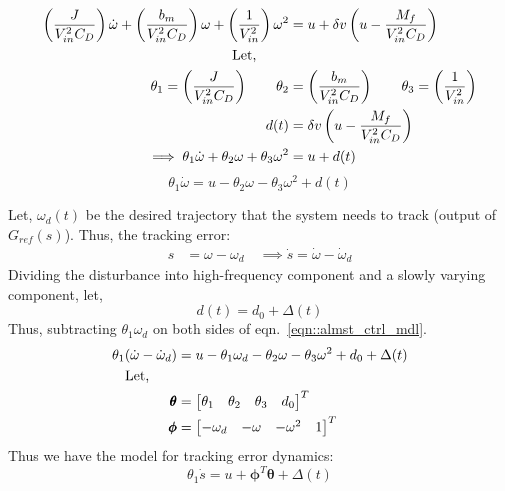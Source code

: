\begin{align*}
    \left( \frac{J}{V_{in}^2 C_D} \right) \dot \omega + \left( \frac{b_m}{V_{in}^2 C_D} \right) \omega + \left( \frac{1}{V_{in}^2} \right) \omega^2  &= u + \delta v \left( u - \frac{M_f}{V_{in}^2 C_D} \right)\\
    \text{Let, } \qquad &\\
    \theta_1 = \left( \frac{J}{V_{in}^2 C_D} \right) \qquad
    \theta_2 &= \left( \frac{b_m}{V_{in}^2 C_D} \right)\qquad
    \theta_3 = \left( \frac{1}{V_{in}^2} \right)\\
    d(t) &= \delta v \left( u - \frac{M_f}{V_{in}^2 C_D} \right)\\
    \implies \theta_1 \dot \omega + \theta_2 \omega + \theta_3 \omega^2 &= u + d(t)
\end{align*}
\begin{equation}\label{eqn::almst_ctrl_mdl}
    \theta_1 \dot \omega = u - \theta_2 \omega - \theta_3 \omega^2 + d(t)
\end{equation}

Let, $\omega_d(t)$ be the desired trajectory that the system needs to track
(output of $G_{ref}(s)$). Thus, the tracking error:
\begin{align*}
    s &= \omega - \omega_d \quad \implies \dot s = \dot \omega - \dot \omega_d
\end{align*}
Dividing the disturbance into high-frequency component and a slowly varying
component, let, $$d(t) = d_0 + \Delta(t)$$
Thus, subtracting $\theta_1 \omega_d$ on both sides of eqn.~\ref{eqn::almst_ctrl_mdl}.
\begin{align*}
    \theta_1 (\dot \omega - \dot \omega_d) &= u - \theta_1 \omega_d - \theta_2 \omega - \theta_3 \omega^2 + d_0 + \Delta(t)\\
    \text{Let,} \qquad\\
    \pmb \theta &= \begin{bmatrix} \theta_1 & \theta_2 & \theta_3 & d_0 \end{bmatrix}^T\\
    \pmb \phi &= \begin{bmatrix} -\omega_d & -\omega & - \omega^2 & 1 \end{bmatrix}^T\\
\end{align*}
Thus we have the model for tracking error dynamics:
\begin{equation}\label{eqn::error_dyn}
    \theta_1 \dot s = u + \pmb \phi^T \pmb \theta + \Delta(t)
\end{equation}


